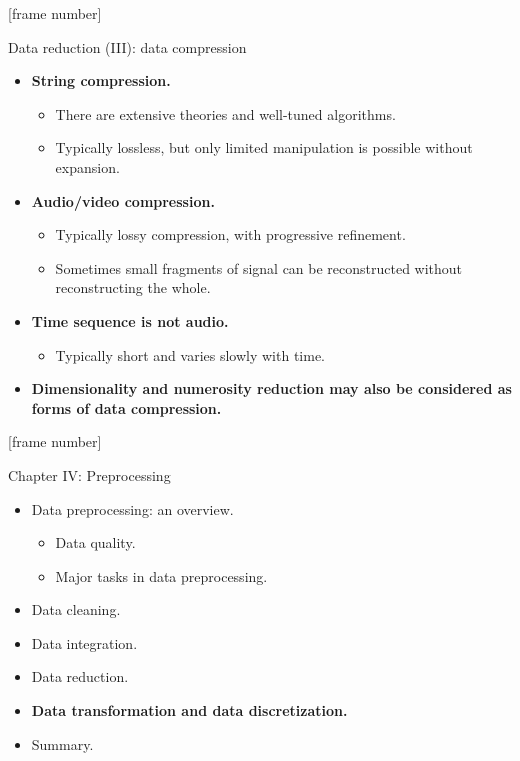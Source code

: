 \documentclass[aspectratio=169,t]{beamer}
\begin{document}
  {
    [frame number]
    \begin{frame}{Data reduction (III): data compression}
        \begin{itemize}
            \item \textbf{String compression.}
            \begin{itemize}
              \item There are extensive theories and well-tuned algorithms.
              \item Typically lossless, but only limited manipulation is possible without expansion.
            \end{itemize}
            \item \textbf{Audio/video compression.}
            \begin{itemize}
              \item Typically lossy compression, with progressive refinement.
              \item Sometimes small fragments of signal can be reconstructed without reconstructing the whole.
            \end{itemize}
            \item \textbf{Time sequence is not audio.}
            \begin{itemize}
              \item Typically short and varies slowly with time.
            \end{itemize}
            \item \textbf{Dimensionality and numerosity reduction may also be considered as forms of data compression.}
        \end{itemize}
    \end{frame}
  }

  {
    [frame number]
    \begin{frame}{Chapter IV: Preprocessing}
        \begin{itemize}
            \item Data preprocessing: an overview.
            \begin{itemize}
              \item Data quality.
              \item Major tasks in data preprocessing.
            \end{itemize}
            \item Data cleaning.
            \item Data integration.
            \item Data reduction.
            \item \textbf{Data transformation and data discretization.}
            \item Summary.
        \end{itemize}
    \end{frame}
  }
\end{document}
